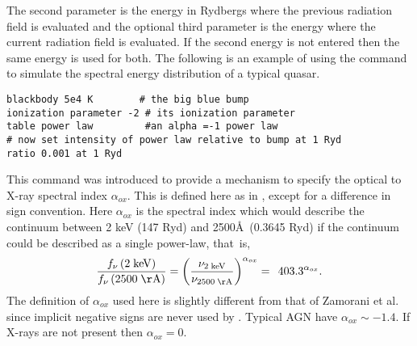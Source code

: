 The second parameter is the energy in Rydbergs where the previous
radiation field is evaluated and the optional third parameter
is the energy
where the current radiation field is evaluated.
If the second energy is not
entered then the same energy is used for both.
The following is an example
of using the  command to simulate the
spectral energy distribution of a typical quasar.
\begin{verbatim}
blackbody 5e4 K        # the big blue bump
ionization parameter -2 # its ionization parameter
table power law         #an alpha =-1 power law
# now set intensity of power law relative to bump at 1 Ryd
ratio 0.001 at 1 Ryd
\end{verbatim}
This command was introduced to provide a mechanism to specify the optical
to X-ray spectral index $\alpha_{ox}$.
This is defined here as in \citet{Zamorani1981}, except for a difference in sign convention.
Here $\alpha_{ox}$ is the spectral
index which would describe the continuum between 2 keV (147 Ryd) and
2500\AA\ (0.3645 Ryd) if the continuum could be described
as a single power-law, that~is,
\begin{equation}
\frac{{f_\nu  \left( {2\;{\mathrm{keV}}} \right)}}{{f_\nu  \left(
{2500\;{\mathrm{{\AA}}}} \right)}} = \left( {\frac{{\nu _{2\;{\mathrm{keV}}} }}{{\nu
_{2500\;{\mathrm{{\AA}}}} }}} \right)^{\alpha _{ox} }  = \,\;403.3^{\alpha _{ox}
} .%
\end{equation}
The definition of $\alpha_{ox}$ used here is slightly different
from that of Zamorani et al. since implicit negative signs are
never used by \Cloudy.
Typical AGN have $\alpha_{ox}\sim  -1.4$.
If X-rays are not present then
$\alpha_{ox} = 0$.

